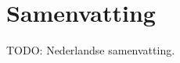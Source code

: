 \chapter{Samenvatting}
\begin{ChapterAbstractNoTitle}
\end{ChapterAbstractNoTitle}

TODO: Nederlandse samenvatting.
